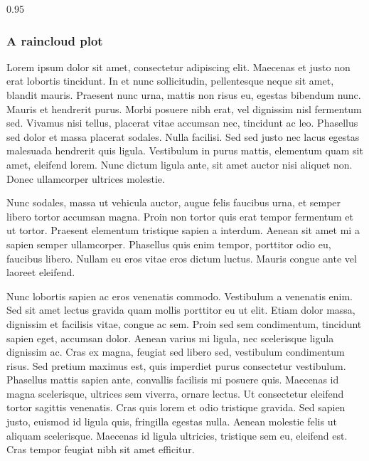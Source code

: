 \documentclass[
]{article}
\begin{document}
\begin{table}[h]
\begin{centerbox}
\begin{threeparttable}
\begin{tabularx}{0.95\textwidth}
\end{tabularx}
\end{threeparttable}\par\end{centerbox}

\end{table}
 

\newpage

\hypertarget{a-raincloud-plot}{%
\subsubsection{A raincloud plot}\label{a-raincloud-plot}}

Lorem ipsum dolor sit amet, consectetur adipiscing elit. Maecenas et
justo non erat lobortis tincidunt. In et nunc sollicitudin, pellentesque
neque sit amet, blandit mauris. Praesent nunc urna, mattis non risus eu,
egestas bibendum nunc. Mauris et hendrerit purus. Morbi posuere nibh
erat, vel dignissim nisl fermentum sed. Vivamus nisi tellus, placerat
vitae accumsan nec, tincidunt ac leo. Phasellus sed dolor et massa
placerat sodales. Nulla facilisi. Sed sed justo nec lacus egestas
malesuada hendrerit quis ligula. Vestibulum in purus mattis, elementum
quam sit amet, eleifend lorem. Nunc dictum ligula ante, sit amet auctor
nisi aliquet non. Donec ullamcorper ultrices molestie.

Nunc sodales, massa ut vehicula auctor, augue felis faucibus urna, et
semper libero tortor accumsan magna. Proin non tortor quis erat tempor
fermentum et ut tortor. Praesent elementum tristique sapien a interdum.
Aenean sit amet mi a sapien semper ullamcorper. Phasellus quis enim
tempor, porttitor odio eu, faucibus libero. Nullam eu eros vitae eros
dictum luctus. Mauris congue ante vel laoreet eleifend.

Nunc lobortis sapien ac eros venenatis commodo. Vestibulum a venenatis
enim. Sed sit amet lectus gravida quam mollis porttitor eu ut elit.
Etiam dolor massa, dignissim et facilisis vitae, congue ac sem. Proin
sed sem condimentum, tincidunt sapien eget, accumsan dolor. Aenean
varius mi ligula, nec scelerisque ligula dignissim ac. Cras ex magna,
feugiat sed libero sed, vestibulum condimentum risus. Sed pretium
maximus est, quis imperdiet purus consectetur vestibulum. Phasellus
mattis sapien ante, convallis facilisis mi posuere quis. Maecenas id
magna scelerisque, ultrices sem viverra, ornare lectus. Ut consectetur
eleifend tortor sagittis venenatis. Cras quis lorem et odio tristique
gravida. Sed sapien justo, euismod id ligula quis, fringilla egestas
nulla. Aenean molestie felis ut aliquam scelerisque. Maecenas id ligula
ultricies, tristique sem eu, eleifend est. Cras tempor feugiat nibh sit
amet efficitur.
\end{document}
